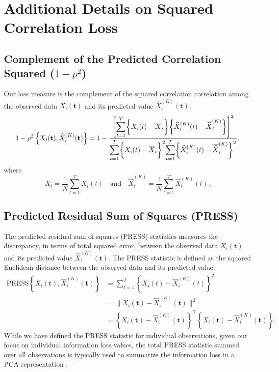 \section{Additional Details on Squared Correlation Loss} \label{sec:squared-correlation}

\subsection{Complement of the Predicted Correlation Squared ($1-\rho^2$)}

Our loss measure is the complement of the squared correlation correlation among the observed data $X_i (\mathbf{t})$ and its predicted value $\widehat{X}^{(K)}_{i} (\mathbf{t})$:
$$
1- \rho^2 \left\{X_i (\mathbf{t}), \widehat{X}^{(K)}_{i} (\mathbf{t}) \right\} =
1 - \frac{\left[ \mathlarger{\sum}_{t = 1}^T{\bigg\{X_i (t) - \overline{X}_i \bigg\} \bigg\{ \widehat{X}_i^{(K)} (t) - \overline{\widehat{X}}_i^{(K)} \bigg\}} \right]^2}{\mathlarger{\sum}_{t = 1}^T \bigg\{X_i (t) - \overline{X}_i \bigg\}^2 \mathlarger{\sum}_{t = 1}^T \bigg\{ \widehat{X}_i^{(K)} (t) - \overline{\widehat{X}}_i^{(K)} \bigg\} ^2},
$$
where
$$
\overline{X}_i = \frac{1}{N} \sum_{t=1}^T X_i (t) \quad \text{and} \quad \overline{\widehat{X}}_i^{(K)} = \frac{1}{N} \sum_{t=1}^T \widehat{X}_i^{(K)} (t).
$$

\subsection{Predicted Residual Sum of Squares (PRESS)}

The predicted residual sum of squares (PRESS) statistics measures the discrepancy, in terms of total squared error, between the observed data $X_i (\mathbf{t})$ and its predicted value $\widehat{X}^{(K)}_{i} (\mathbf{t})$. 
The PRESS statistic is defined as the squared Euclidean distance between the observed data and its predicted value:
\begin{align*}
    \text{PRESS}\left\{X_i (\mathbf{t}), \widehat{X}^{(K)}_{i} (\mathbf{t}) \right\} 
&= 
\sum_{t = 1}^T \left\{ X_{i}(t) - \widehat{X}^{(K)}_{i} (t)\right\}^2 \\
&=
\bigg\| X_i (\mathbf{t}) - \widehat{X}^{(K)}_{i} (\mathbf{t}) \bigg\|^2\\
&=
\left\{X_i (\mathbf{t}) - \widehat{X}^{(K)}_{i} (\mathbf{t})\right\}^\top \left\{X_i (\mathbf{t}) - \widehat{X}^{(K)}_{i} (\mathbf{t})\right\}.
\end{align*}
While we have defined the PRESS statistic for individual observations, given our focus on individual information loss values, the total PRESS statistic summed over all observations is typically used to summarize the information loss in a PCA representation \parencite{bro_cross-validation_2008}.

